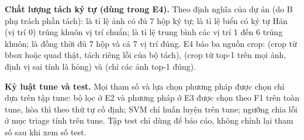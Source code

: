 \textbf{Chất lượng tách ký tự (dùng trong E4).} Theo định nghĩa của dự án (do B phụ trách phần tách):  là tỉ lệ ảnh có đủ 7 hộp ký tự;  là tỉ lệ biển có ký tự Hán (vị trí 0) trúng khuôn vị trí chuẩn;  là tỉ lệ trung bình các vị trí 1 đến 6 trúng khuôn;  là đồng thời đủ 7 hộp và cả 7 vị trí đúng. E4 báo ba nguồn crop:  (crop từ bbox hoặc quad thật, tách riêng lỗi của bộ tách),  (crop từ top-1 trên mọi ảnh, định vị sai tính là hỏng) và  (chỉ các ảnh top-1 đúng).

\textbf{Kỷ luật tune và test.} Mọi tham số và lựa chọn phương pháp được chọn chỉ dựa trên tập tune: bộ lọc ở E2 và phương pháp ở E3 được chọn theo F1 trên toàn tune, hòa thì theo thứ tự cố định; SVM chỉ huấn luyện trên tune; ngưỡng chia lỗi ở mục triage tính trên tune. Tập test chỉ dùng để báo cáo, không chỉnh lại tham số sau khi xem số test.
